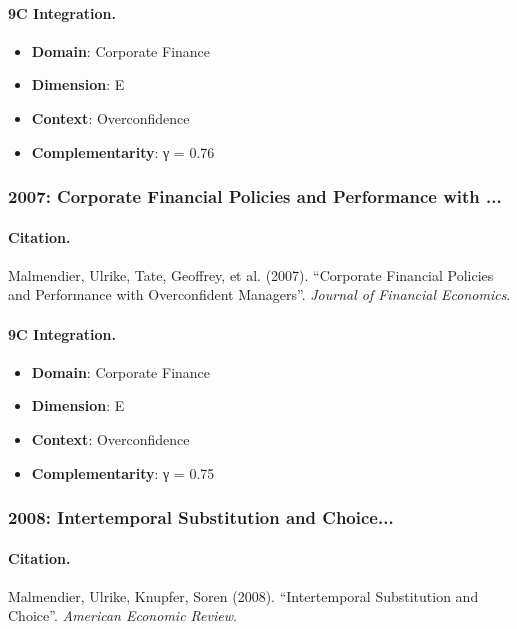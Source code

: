 \paragraph{9C Integration.}
\begin{itemize}[nosep]
  \item \textbf{Domain}: Corporate Finance
  \item \textbf{Dimension}: E
  \item \textbf{Context}: Overconfidence
  \item \textbf{Complementarity}: γ = 0.76
\end{itemize}


\subsubsection{2007: Corporate Financial Policies and Performance with ...}

\paragraph{Citation.}
Malmendier, Ulrike, Tate, Geoffrey, et al. (2007). ``Corporate Financial Policies and Performance with Overconfident Managers''. \textit{Journal of Financial Economics}.

\paragraph{9C Integration.}
\begin{itemize}[nosep]
  \item \textbf{Domain}: Corporate Finance
  \item \textbf{Dimension}: E
  \item \textbf{Context}: Overconfidence
  \item \textbf{Complementarity}: γ = 0.75
\end{itemize}


\subsubsection{2008: Intertemporal Substitution and Choice...}

\paragraph{Citation.}
Malmendier, Ulrike, Knupfer, Soren (2008). ``Intertemporal Substitution and Choice''. \textit{American Economic Review}.

